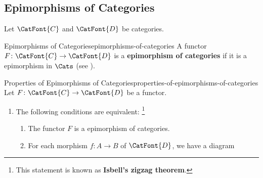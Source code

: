 \subsection{Epimorphisms of Categories}\label{subsection-epimorphisms-of-categories}
Let $\CatFont{C}$ and $\CatFont{D}$ be categories.
\begin{definition}{Epimorphisms of Categories}{epimorphisms-of-categories}%
    A functor $F\colon\CatFont{C}\to\CatFont{D}$ is a \textbf{epimorphism of categories} if it is a epimorphism in $\Cats$ (see ).%
\end{definition}
\begin{proposition}{Properties of Epimorphisms of Categories}{properties-of-epimorphisms-of-categories}%
    Let $F\colon\CatFont{C}\to\CatFont{D}$ be a functor.
    \begin{enumerate}
        \item\label{properties-of-epimorphisms-of-categories-characterisations}The following conditions are equivalent:%
            \footnote{%
                This statement is known as \textbf{Isbell's zigzag theorem}.
                \par\vspace*{\TCBBoxCorrection}
            }%
            \begin{enumerate}
                \item\label{properties-of-epimorphisms-of-categories-characterisations-a}The functor $F$ is a epimorphism of categories.
                \item\label{properties-of-epimorphisms-of-categories-characterisations-b}For each morphism $f\colon A\to B$ of $\CatFont{D}$, we have a diagram
                    \begin{scalemath}
\end{scalemath}
\end{enumerate}
\end{enumerate}
\end{proposition}

